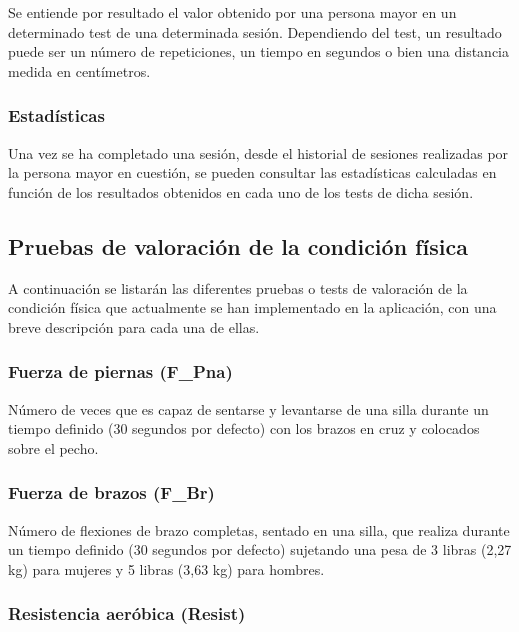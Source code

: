 Se entiende por resultado el valor obtenido por una persona mayor en un determinado test de una determinada sesión. Dependiendo del test, un resultado puede ser un número de repeticiones, un tiempo en segundos o bien una distancia medida en centímetros.

\subsubsection{Estadísticas}

Una vez se ha completado una sesión, desde el historial de sesiones realizadas por la persona mayor en cuestión, se pueden consultar las estadísticas calculadas en función de los resultados obtenidos en cada uno de los tests de dicha sesión.

\subsection{Pruebas de valoración de la condición física}

A continuación se listarán las diferentes pruebas o tests de valoración de la condición física que actualmente se han implementado en la aplicación, con una breve descripción para cada una de ellas.

\subsubsection{Fuerza de piernas (F\_Pna)}

Número de veces que es capaz de sentarse y levantarse de una silla durante un tiempo definido (30 segundos por defecto) con los brazos en cruz y colocados sobre el pecho.


\subsubsection{Fuerza de brazos (F\_Br)}

Número de flexiones de brazo completas, sentado en una silla, que realiza durante un tiempo definido (30 segundos por defecto) sujetando una pesa de 3 libras (2,27 kg) para mujeres y 5 libras (3,63 kg) para hombres.


\subsubsection{Resistencia aeróbica (Resist)}


